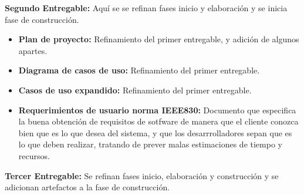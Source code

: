                 \textbf{Segundo Entregable:} Aquí se se refinan fases inicio y elaboración y se
                inicia fase de construcción.
                
                \begin{itemize}
                \item\textbf{Plan de proyecto:} Refinamiento del primer entregable, y adición de
                algunos apartes.
                \item\textbf{Diagrama de casos de uso:} Refinamiento del primer entregable.
                \item\textbf{Casos de uso expandido:} Refinamiento del primer entregable.
                \item\textbf{Requerimientos de usuario norma IEEE830:} Documento que especifica la
                buena obtención de requisitos de sotfware de manera que el cliente conozca bien que
                es lo que desea del sistema, y que los desarrrolladores sepan que es lo que deben
                realizar, tratando de prever malas estimaciones de tiempo y recursos.
                \end{itemize}
                
                \textbf{Tercer Entregable:} Se refinan fases inicio, elaboración y construcción y
                se adicionan artefactos a la fase de construcción.
                
